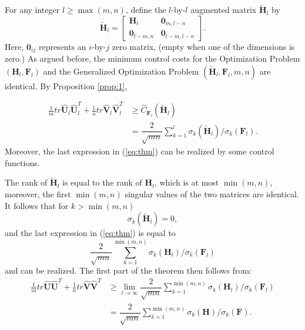 \documentclass[12pt,onecolumn,draftcls]{IEEEtran}
\begin{document}
For any integer $l \geqslant \max(m,n)$, define the $l$-by-$l$ augmented matrix $\mathbf{\tilde{H}}_l$ by
\begin{equation}
\mathbf{\tilde{H}}_l= \left[
\begin{array}{ll}
\mathbf{H}_l & \mathbf{0}_{m,l-n} \\
\mathbf{0}_{l-m,n} & \mathbf{0}_{l-m,l-n}
\end{array} \right].
\end{equation}
Here, $\mathbf{0}_{ij}$ represents an $i$-by-$j$ zero matrix, (empty when one of the dimensions is zero.)
As argued before, the minimum control costs for the Optimization Problem
$(\mathbf{H}_l, \mathbf{F}_l)$ and the Generalized Optimization Problem
$(\mathbf{\tilde{H}}_l, \mathbf{F}_l,m,n)$ are identical.  By Proposition \ref{prop:1},

\begin{align}
\frac{1}{m} tr \mathbf{\hat{U}}_l \mathbf{\hat{U}}_l^T +
\frac{1}{n}tr \mathbf{\hat{V}}_l \mathbf{\hat{V}}_l^T 
& \geq  \hat{C}_{\mathbf{F}_l}(\mathbf{\tilde{H}}_l)\\
& = \dfrac{2}{\sqrt{mn}}
\sum_{k=1}^{l} \sigma_{k}(\mathbf{\tilde{H}}_l)/\sigma_{k}(\mathbf{F}_l).
\label{eq:thm}
\end{align}
Moreover, the last expression in (\ref{eq:thm}) can be realized by some control functions. 

The rank of $\mathbf{\tilde{H}}_l$ is equal to the rank of
$\mathbf{H}_l$, which is at most $\min(m,n)$, moreover, the first $\min(m,n)$
singular values of the two matrices are identical.   It follows that
for $k >\min(m,n)$
\begin{equation}
\sigma_k(\mathbf{\tilde{H}}_l)=0,
\end{equation}
and the last expression in (\ref{eq:thm}) is equal to
\begin{equation}
\frac{2}{\sqrt{mn}} \sum_{k=1}^{\min(m,n)} \sigma_{k}(\mathbf{H}_l)/\sigma_{k}(\mathbf{F}_l)
\end{equation}
and can be realized.
The first part of the theorem then follows from:
\begin{align}
\frac{1}{m} tr \mathbf{\hat{U}} \mathbf{\hat{U}}^T +
\frac{1}{n}tr \mathbf{\hat{V}} \mathbf{\hat{V}}^T
& \geq
\lim_{l\rightarrow \infty}  \dfrac{2}{\sqrt{mn}}
\sum_{k=1}^{\min(m,n)}
\sigma_{k}(\mathbf{H}_l)/\sigma_{k}(\mathbf{F}_l) \nonumber\\
& =  \dfrac{2}{\sqrt{mn}} \sum_{k=1}^{\min(m,n)} \sigma_{k}(\mathbf{H})/\sigma_{k}(\mathbf{F}). \label{eq:generalH4}
\end{align}
\end{document}
